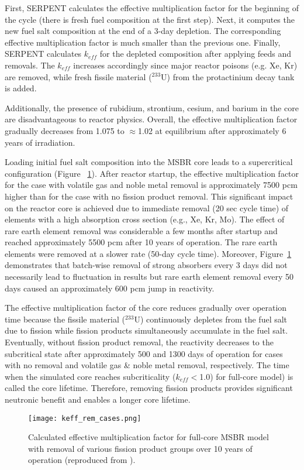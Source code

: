 First, SERPENT calculates the effective multiplication factor for the beginning 
of the cycle (there is fresh fuel composition at the first step). Next, it 
computes the new fuel salt composition at the end of a 3-day depletion. The 
corresponding effective multiplication factor is much smaller than the previous 
one. Finally, SERPENT calculates $k_{eff}$ for the depleted composition after 
applying feeds and removals. The $k_{eff}$ increases accordingly since major reactor 
poisons (e.g. Xe, Kr) are removed, while fresh fissile material ($^{233}$U) 
from the protactinium decay tank is added.  

Additionally, the presence of rubidium, strontium, cesium, and barium in the 
core are disadvantageous to reactor physics. 
Overall, the effective multiplication factor gradually decreases from 1.075 to 
$\approx$1.02 at equilibrium after approximately 6 years of irradiation. 

Loading initial fuel salt composition into the \gls{MSBR} core leads to a 
supercritical configuration (Figure ~\ref{fig:fp_removal}). After reactor 
startup, the effective multiplication factor for the case with volatile gas 
and noble metal removal is approximately 7500 pcm  higher than for the case with 
no fission product removal. This significant impact on the reactor core is
achieved due to immediate removal (20 sec cycle time) of elements with a high 
absorption cross section (e.g., Xe, Kr, Mo). The effect of rare earth 
element removal was considerable a few months after startup and reached 
approximately 5500 pcm after 10 years of operation. The rare earth elements were 
removed at a slower rate (50-day cycle time). Moreover, 
Figure~\ref{fig:fp_removal} demonstrates that batch-wise removal of strong 
absorbers every 3 days did not necessarily lead to fluctuation in results 
but rare earth element removal every 50 days caused an approximately 600 pcm jump 
in reactivity.

The effective multiplication factor of the core reduces gradually over 
operation time because the fissile material ($^{233}$U) continuously depletes 
from the fuel salt due to fission while fission products simultaneously
accumulate in the fuel salt. Eventually, without fission product removal, 
the reactivity decreases to the subcritical state after approximately 500 and 
1300 days of operation for cases with no removal and volatile gas \& noble 
metal removal, respectively. The time when the simulated core reaches 
subcriticality ($k_{eff}<$1.0) for full-core model) is called the core lifetime. 
Therefore, removing fission products provides significant neutronic benefit 
and enables a longer core lifetime.
\begin{figure}[ht!] %
  \centering
  \texttt{[image: keff\_rem\_cases.png]} 
  \caption{Calculated effective multiplication factor for full-core \gls{MSBR} 
model with removal of various fission product groups over 10 years of 
operation (reproduced from \cite{rykhlevskii_modeling_2019}).}
  \label{fig:fp_removal}
\end{figure}

